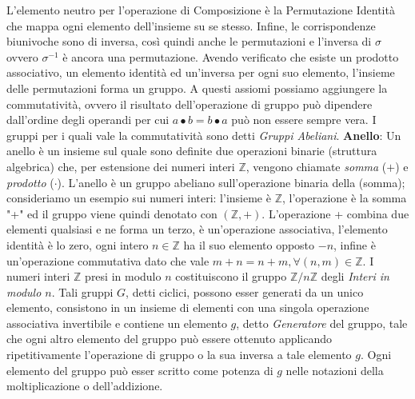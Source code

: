 \documentclass[a4paper,12pt]{tesiinfo}
\begin{document}
\newline
L'elemento neutro per l'operazione di Composizione \`e la Permutazione Identit\`a che mappa ogni elemento dell'insieme su se stesso. 
\newline
Infine, le corrispondenze biunivoche sono di inversa, cos\`i quindi anche le permutazioni e l'inversa di $\sigma$ ovvero $ \sigma ^ {-1} $ \`e ancora una permutazione.
\newline
Avendo verificato che esiste un prodotto associativo, un elemento identit\`a ed un'inversa per ogni suo elemento, l'insieme delle permutazioni forma un gruppo.
%
%
%
\newline\newline
A questi assiomi possiamo aggiungere la commutativit\`a, ovvero il risultato dell'operazione di gruppo pu\`o dipendere dall'ordine degli operandi per cui $ a \bullet b = b \bullet a$ pu\`o non essere sempre vera. 
\newline
I gruppi per i quali vale la commutatività sono detti \textit{Gruppi Abeliani}.
\newline\newline
%
%
%
\textbf{Anello}: Un anello \`e un insieme sul quale sono definite due operazioni binarie (struttura algebrica) che, per estensione dei numeri interi $\mathbb{Z}$, vengono chiamate \textit{somma} ($+$) e \textit{prodotto} ($\cdot$). L'anello \`e un gruppo abeliano sull'operazione binaria della (somma); consideriamo un esempio sui numeri interi: l'insieme \`e $\mathbb{Z}$, l'operazione \`e la somma "+" ed il gruppo viene quindi denotato con $(\mathbb{Z}, +)$. L'operazione + combina due elementi qualsiasi e ne forma un terzo, \`e un'operazione associativa, l'elemento identit\`a \`e lo zero, ogni intero $n \in \mathbb{Z}$ ha il suo elemento opposto $-n$, infine \`e un'operazione commutativa dato che vale $m + n = n + m, \forall (n, m) \in \mathbb{Z}$.
\newline
I numeri interi $\mathbb{Z}$ presi in modulo $n$ costituiscono il gruppo $\mathbb{Z}/ n \mathbb{Z}$ degli \textit{Interi in modulo $n$}. Tali gruppi $G$, detti ciclici, possono esser generati da un unico elemento, consistono in un insieme di elementi con una singola operazione associativa invertibile e contiene un elemento $g$, detto \textit{Generatore} del gruppo, tale che ogni altro elemento del gruppo pu\`o essere ottenuto applicando ripetitivamente l'operazione di gruppo o la sua inversa a tale elemento $g$. Ogni elemento del gruppo pu\`o esser scritto come potenza di $g$ nelle notazioni della moltiplicazione o dell'addizione.
\end{document}
